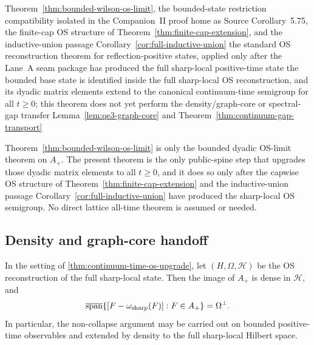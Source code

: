 \dependencyledger
  {Theorem~\ref{thm:bounded-wilson-os-limit}, the bounded-state restriction compatibility isolated in the Companion~II proof home as Source Corollary~5.75, the finite-cap OS structure of Theorem~\ref{thm:finite-cap-extension}, and the inductive-union passage Corollary~\ref{cor:full-inductive-union}}
  {the standard OS reconstruction theorem for reflection-positive states, applied only after the Lane~A seam package has produced the full sharp-local positive-time state}
  {the bounded base state is identified inside the full sharp-local OS reconstruction, and its dyadic matrix elements extend to the canonical continuum-time semigroup for all $t\ge 0$; this theorem does not yet perform the density/graph-core or spectral-gap transfer}
  {Lemma~\ref{lem:qe3-graph-core} and Theorem~\ref{thm:continuum-gap-transport}}
\begin{remark}
Theorem~\ref{thm:bounded-wilson-os-limit} is only the bounded dyadic OS-limit theorem on $A_+$. The present theorem is the only public-spine step that upgrades those dyadic matrix elements to all $t\ge 0$, and it does so only after the capwise OS structure of Theorem~\ref{thm:finite-cap-extension} and the inductive-union passage Corollary~\ref{cor:full-inductive-union} have produced the sharp-local OS semigroup. No direct lattice all-time theorem is assumed or needed.
\end{remark}


\subsection{Density and graph-core handoff}

\begin{corollary}\label{cor:density-bounded-base}
In the setting of \cref{thm:continuum-time-os-upgrade}, let $(H,\Omega,\mathcal H)$ be the OS reconstruction of the full sharp-local state. Then the image of $A_+$ is dense in $\mathcal H$, and
\[
\overline{\operatorname{span}}\{[F-\omega_{\mathrm{sharp}}(F)]:F\in A_+\}=\Omega^{\perp}.
\]
In particular, the non-collapse argument may be carried out on bounded positive-time observables and extended by density to the full sharp-local Hilbert space.
\end{corollary}

